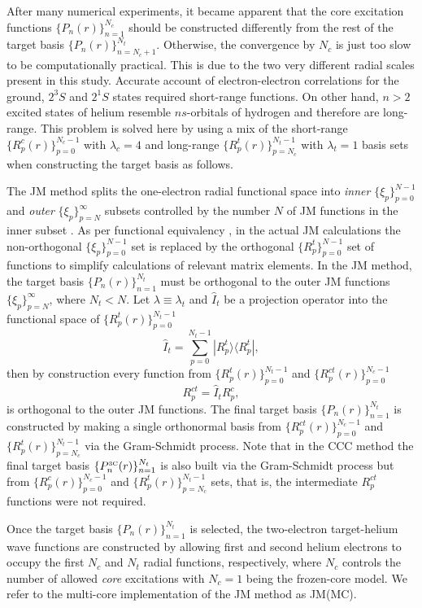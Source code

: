 \documentclass[aip
, pra
, showpacs
, aps
, twocolumn
, groupedaddress
, floatfix
]{revtex4}
\newcommand{\beq}{\begin{equation}}
\newcommand{\eeq}{\end{equation}}
\begin{document}
After many numerical experiments, it became apparent that the core excitation functions $\{P_n(r)\}_{n=1}^{N_c}$ should be constructed differently from the rest of the target basis
$\{P_n(r)\}_{n=N_c+1}^{N_t}$. Otherwise, the convergence by $N_c$ is just too slow to be computationally practical.
This is due to the two very different radial scales present in this study.
Accurate account of electron-electron correlations for the ground, $2^3S$ and $2^1S$ states required short-range functions. 
On other hand,  $n>2$ excited states of helium 
resemble $ns$-orbitals of hydrogen and therefore are long-range.
This problem is solved here by using a mix of the short-range $\{R^c_p(r)\}_{p=0}^{N_c-1}$ with $\lambda_c=4$
and long-range $\{R^t_p(r)\}_{p=N_c}^{N_t-1}$ with $\lambda_t=1$  basis sets
when constructing the target basis as follows.


The JM method splits the one-electron radial functional space into {\em inner} $\{\xi_p\}_{p=0}^{N-1}$
and {\em outer} $\{\xi_p\}_{p=N}^\infty$
subsets controlled by the number $N$ of JM functions in the inner subset \cite{HY74p1201,BR76p1491}.
As per functional equivalency \cite{KB10p022708}, in the actual JM calculations the non-orthogonal $\{\xi_p\}_{p=0}^{N-1}$ set is replaced by
the orthogonal $\{R^t_p\}_{p=0}^{N-1}$ set of functions to simplify calculations of relevant matrix elements.
In the JM method, the target basis $\{P_n(r)\}_{n=1}^{N_t}$ must be orthogonal to the outer JM functions $\{\xi_p\}_{p=N}^\infty$, where $N_t<N$.
Let $\lambda \equiv \lambda_t$ and $\hat{I}_t$ be a projection operator into the functional space of $\{R^t_p(r)\}_{p=0}^{N_t-1}$
\beq
\hat{I}_t = \sum_{p=0}^{N_t-1} | R_p^t \rangle \langle R_p^t |,
\label{I_t}
\eeq
then by construction every function from $\{R^t_p(r)\}_{p=0}^{N_t-1}$ and  $\{R^{ct}_p(r)\}_{p=0}^{N_c-1}$
\beq
R^{ct}_p = \hat{I}_t R^{c}_p,
\eeq
is orthogonal to the outer JM functions.
The final target basis $\{P_n(r)\}_{n=1}^{N_t}$ is constructed by making a single orthonormal basis from
$\{R^{ct}_p(r)\}_{p=0}^{N_c-1}$ and $\{R^t_p(r)\}_{p=N_c}^{N_t-1}$
via the Gram-Schmidt process.
Note that in the CCC method the final target basis
$\{P^{\mbox{{\tiny 3C}}}_n(r)\}_{n=1}^{N_t}$ is also built via the Gram-Schmidt process but from
$\{R^{c}_p(r)\}_{p=0}^{N_c-1}$ and $\{R^t_p(r)\}_{p=N_c}^{N_t-1}$ sets, that is, the intermediate $R^{ct}_p$ functions were not required.



Once the target basis $\{P_n(r)\}_{n=1}^{N_t}$ is selected,
the two-electron target-helium wave functions are constructed by allowing first and second helium electrons to occupy the first $N_c$ and $N_t$ radial functions, respectively,
where $N_c$ controls the number of allowed {\em core} excitations with $N_c=1$ being the frozen-core model.
We refer to the multi-core implementation of the JM method as JM(MC).
\end{document}
